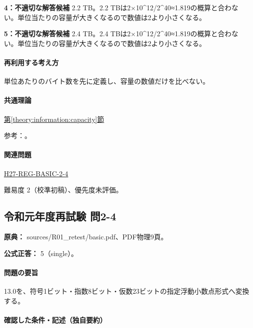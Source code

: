 \noindent\textbf{4：不適切な解答候補} 2.2 TB。2.2 TBは2×10\textasciicircum{}12/2\textasciicircum{}40≈1.819の概算と合わない。単位当たりの容量が大きくなるので数値は2より小さくなる。\par

\noindent\textbf{5：不適切な解答候補} 2.4 TB。2.4 TBは2×10\textasciicircum{}12/2\textasciicircum{}40≈1.819の概算と合わない。単位当たりの容量が大きくなるので数値は2より小さくなる。\par

\paragraph{再利用する考え方} 単位あたりのバイト数を先に定義し、容量の数値だけを比べない。

\paragraph{共通理論} \hyperref[theory:information:capacity]{第\ref*{theory:information:capacity}節}

\par 参考：\cite{nist_binary_prefix}。

\paragraph{関連問題} \hyperref[q:h27-reg-basic-2-4]{H27-REG-BASIC-2-4}

\par 難易度 2（校準初稿）、優先度未評価。

\subsection{令和元年度再試験 問2-4}
\label{q:r01-ret-basic-2-4}

\noindent\textbf{原典：} sources/R01\_retest/basic.pdf、PDF物理9頁。

\textbf{公式正答：} 5（single）。

\paragraph{問題の要旨} 13.0を、符号1ビット・指数8ビット・仮数23ビットの指定浮動小数点形式へ変換する。

\paragraph{確認した条件・記述（独自要約）}\mbox{}\par

